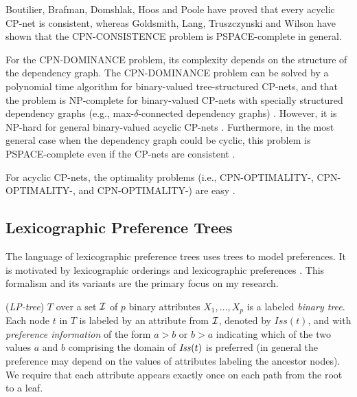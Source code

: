 


Boutilier, Brafman, Domshlak, Hoos and Poole \cite{bbdh03} 
have proved that every acyclic CP-net
is consistent, whereas Goldsmith, Lang, Truszczynski and Wilson \cite{Goldsmith}
have shown that the CPN-CONSISTENCE problem is PSPACE-complete in general.

For the CPN-DOMINANCE problem, its complexity depends on the structure
of the dependency graph.
The CPN-DOMINANCE problem can be solved by
a polynomial time algorithm for binary-valued tree-structured
CP-nets, and that the problem is NP-complete for binary-valued
CP-nets with specially structured dependency graphs 
(e.g., max-$\delta$-connected dependency graphs) \cite{bbdh03}.
However, it is NP-hard for general binary-valued acyclic 
CP-nets \cite{bbdh03}.
Furthermore, in the most general case when the dependency graph
could be cyclic, this problem is PSPACE-complete even
if the CP-nets are consistent \cite{Goldsmith}.

For acyclic CP-nets, the optimality problems (i.e.,
CPN-OPTIMALITY-, CPN-OPTIMALITY-, and
CPN-OPTIMALITY-) are easy \cite{bbdh03}.



\subsection{Lexicographic Preference Trees \label{sec:LPT}}
The language of lexicographic preference trees \cite{booth:learningLP} 
uses trees to model preferences. It is motivated by lexicographic
orderings \cite{Kaci:Pref} and lexicographic preferences \cite{10.2307/2296854}.
This formalism and its variants are the primary focus on my research.

 (\emph{LP-tree}) $T$ over a set $\mathcal{I}$ 
of $p$ binary attributes $X_1,\ldots,X_p$ is a labeled \emph{binary tree}. Each
node $t$ in $T$ is labeled by an attribute from $\mathcal{I}$, denoted by 
$\mathit{Iss}(t)$, and with \emph{preference information} of the form
$a>b$ or $b>a$ indicating which of the two values $a$ and $b$  comprising
the domain of $\mathit{Iss}(t)$ is preferred (in general the preference may depend
on the values of attributes labeling the ancestor nodes). We require that 
each attribute appears exactly once on each path from the root to a leaf. 

